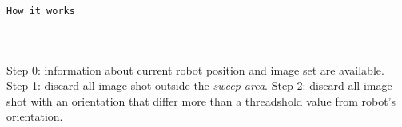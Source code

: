 {\begin{block} {\alert{\texttt{How it works}}}
\begin{columns}
{{\begin{center}
          \end{center}
        }
      }
      
       {
      }
      
    \end{columns}

    \vskip8pt
    
    \footnotesize{
       {\alert{Step 0}: information about current robot position and image set are
      available.}
       {\alert{Step 1}: discard all image shot outside the \textit{sweep area}.}
       {\alert{Step 2}: discard all image shot with an orientation that differ more
        than a threadshold value from robot's orientation.}
     
    }
  \end{block}
}

